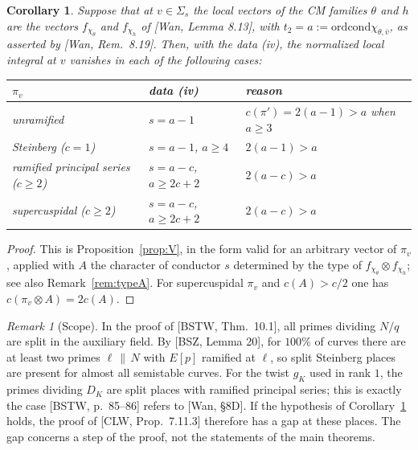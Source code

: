 \documentclass[11pt]{amsart}
\newtheorem{corollary}[theorem]{Corollary}
\theoremstyle{definition}
\theoremstyle{remark}
\newtheorem{remark}[theorem]{Remark}
\newcommand{\cond}{\mathrm{cond}}
\begin{document}
\begin{corollary}\label{cor:gap}
Suppose that at $v\in\Sigma_s$ the local vectors of the CM families $\theta$ and $h$ are the vectors $f_{\chi_\theta}$ and $f_{\chi_h}$ of [Wan, Lemma 8.13], with $t_2=a:=\mathrm{ord}\cond\chi_{\theta,\bar v}$, as asserted by [Wan, Rem.~8.19]. Then, with the data (iv), the normalized local integral at $v$ vanishes in each of the following cases:
\begin{center}
\begin{tabular}{lll}
\toprule
$\pi_v$ & data (iv) & reason\\ \midrule
unramified & $s=a-1$ & $c(\pi')=2(a-1)>a$ when $a\ge3$\\
Steinberg ($c=1$) & $s=a-1$, $a\ge4$ & $2(a-1)>a$\\
ramified principal series ($c\ge2$) & $s=a-c$, $a\ge 2c+2$ & $2(a-c)>a$\\
supercuspidal ($c\ge2$) & $s=a-c$, $a\ge 2c+2$ & $2(a-c)>a$\\ \bottomrule
\end{tabular}
\end{center}
\end{corollary}

\begin{proof}
This is Proposition~\ref{prop:V}, in the form valid for an arbitrary vector of $\pi_v$, applied with $A$ the character of conductor $s$ determined by the type of $f_{\chi_\theta}\otimes f_{\chi_h}$; see also Remark~\ref{rem:typeA}. For supercuspidal $\pi_v$ and $c(A)>c/2$ one has $c(\pi_v\otimes A)=2c(A)$.
\end{proof}

\begin{remark}[Scope]
In the proof of [BSTW, Thm.~10.1], all primes dividing $N/q$ are split in the auxiliary field. By [BSZ, Lemma 20], for $100\%$ of curves there are at least two primes $\ell\,\|\,N$ with $E[p]$ ramified at $\ell$, so split Steinberg places are present for almost all semistable curves. For the twist $g_K$ used in rank $1$, the primes dividing $D_K$ are split places with ramified principal series; this is exactly the case [BSTW, p.~85--86] refers to [Wan, \S 8D]. If the hypothesis of Corollary~\ref{cor:gap} holds, the proof of [CLW, Prop.~7.11.3] therefore has a gap at these places. The gap concerns a step of the proof, not the statements of the main theorems.
\end{remark}
\end{document}
